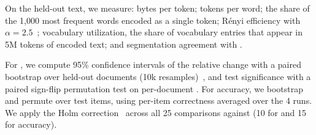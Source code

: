 On the held-out text, we measure:
bytes per token;
tokens per word;
the share of the 1,000 most frequent words encoded as a single token;
R\'enyi efficiency with $\alpha=2.5$~\citep{zouhar2023tokenization};
vocabulary utilization, \ie the share of vocabulary entries that appear in 5M tokens of encoded text;
and segmentation agreement with \freq.

For \bpb, we compute 95\% confidence intervals of the relative change with a paired bootstrap over held-out documents (10k resamples)~\citep{efron1994introduction}, and test significance with a paired sign-flip permutation test on per-document \bpb.
For accuracy, we bootstrap and permute over test items, using per-item correctness averaged over the 4 runs.
We apply the Holm correction~\citep{holm1979simple} across all 25 comparisons against \freq (10 for \bpb and 15 for accuracy).
